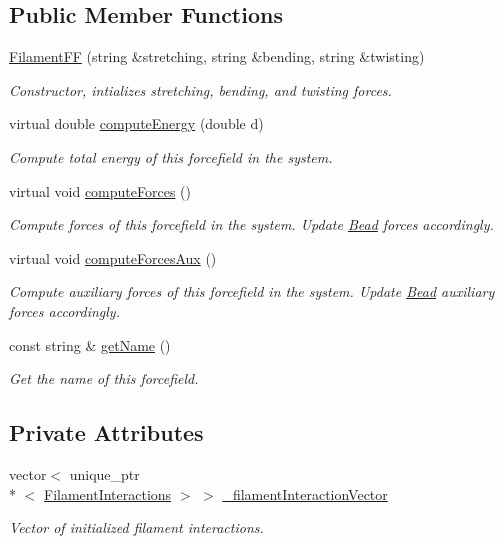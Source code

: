 \subsection*{Public Member Functions}
\begin{DoxyCompactItemize}
\item 
\hyperlink{classFilamentFF_adb9c8c7cefad39032904f5ca45b93bee}{Filament\+F\+F} (string \&stretching, string \&bending, string \&twisting)
\begin{DoxyCompactList}\small\item\em Constructor, intializes stretching, bending, and twisting forces. \end{DoxyCompactList}\item 
virtual double \hyperlink{classFilamentFF_a674c41c3a54a4a831645c9d9c29548d6}{compute\+Energy} (double d)
\begin{DoxyCompactList}\small\item\em Compute total energy of this forcefield in the system. \end{DoxyCompactList}\item 
virtual void \hyperlink{classFilamentFF_aefad1ae887d21c012ea4c306c1322b6a}{compute\+Forces} ()
\begin{DoxyCompactList}\small\item\em Compute forces of this forcefield in the system. Update \hyperlink{classBead}{Bead} forces accordingly. \end{DoxyCompactList}\item 
virtual void \hyperlink{classFilamentFF_aed8560b762846b8fe27ae5e802f6c053}{compute\+Forces\+Aux} ()
\begin{DoxyCompactList}\small\item\em Compute auxiliary forces of this forcefield in the system. Update \hyperlink{classBead}{Bead} auxiliary forces accordingly. \end{DoxyCompactList}\item 
const string \& \hyperlink{classForceField_a4a09e09603b4c4650dc7b3b0f0912fd2}{get\+Name} ()
\begin{DoxyCompactList}\small\item\em Get the name of this forcefield. \end{DoxyCompactList}\end{DoxyCompactItemize}
\subsection*{Private Attributes}
\begin{DoxyCompactItemize}
\item 
vector$<$ unique\+\_\+ptr\\*
$<$ \hyperlink{classFilamentInteractions}{Filament\+Interactions} $>$ $>$ \hyperlink{classFilamentFF_a39272b8a1c853994c5835a1c2b91b84a}{\+\_\+filament\+Interaction\+Vector}
\begin{DoxyCompactList}\small\item\em Vector of initialized filament interactions. \end{DoxyCompactList}\end{DoxyCompactItemize}


